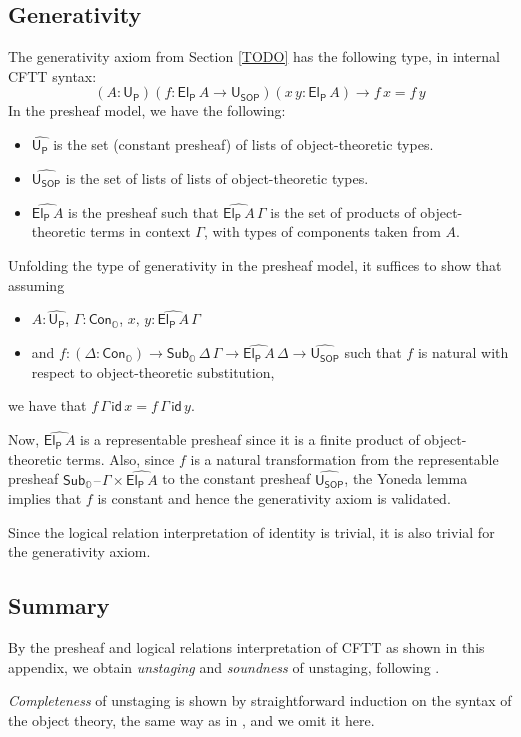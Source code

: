 \documentclass[acmsmall,screen,review,anonymous]{acmart}
\newcommand{\mit}[1]{{\mathsf{#1}}}
\newcommand{\msf}[1]{{\mathsf{#1}}}
\newcommand{\mbb}[1]{\mathbb{#1}}
\newcommand{\U}{\mathsf{U}}
\newcommand{\wh}[1]{\widehat{#1}}
\newcommand{\Cono}{\msf{Con}_{\mbbo}}
\newcommand{\Subo}{\msf{Sub}_{\mbbo}}
\newcommand{\mbbo}{\mbb{O}}
\newcommand{\USOP}{\msf{U}_{\msf{SOP}}}
\newcommand{\Uprod}{\msf{U_P}}
\newcommand{\Elprod}{\msf{El_{P}}}
\newcommand{\blank}{{\mathord{\hspace{1pt}\text{--}\hspace{1pt}}}}
\theoremstyle{remark}
\newcommand{\id}{\mit{id}}
\begin{document}
\subsection{Generativity}

The generativity axiom from Section \ref{TODO} has the following type, in internal
CFTT syntax:
\[ (A : \U_\msf{P})(f : \Elprod\,A \to \USOP)(x\,y : \Elprod\,A) \to f\,x = f\,y  \]
In the presheaf model, we have the following:
\begin{itemize}
\item $\wh{\Uprod}$ is the set (constant presheaf) of lists of object-theoretic types.
\item $\wh{\USOP}$ is the set of lists of lists of object-theoretic types.
\item $\wh{\Elprod\,A}$ is the presheaf such that $\wh{\Elprod\,A}\,\Gamma$ is
  the set of products of object-theoretic terms in context $\Gamma$, with types
  of components taken from $A$.
\end{itemize}
Unfolding the type of generativity in the presheaf model, it suffices to show
that assuming
\begin{itemize}
\item $A : \wh{\Uprod}$, $\Gamma : \Cono$, $x,\,y : \wh{\Elprod\,A}\,\Gamma$
\item and $f : (\Delta : \Cono) \to \Subo\,\Delta\,\Gamma \to \wh{\Elprod\,A}\,\Delta \to \wh{\USOP}$ such that $f$ is natural with respect to object-theoretic substitution,
\end{itemize}
we have that $f\,\Gamma\,\id\,x = f\,\Gamma\,\id\,y$.

Now, $\wh{\Elprod\,A}$ is a representable presheaf since it is a finite product
of object-theoretic terms. Also, since $f$ is a natural transformation from the
representable presheaf $\Subo\blank\Gamma \times \wh{\Elprod\,A}$ to the
constant presheaf $\wh{\USOP}$, the Yoneda lemma implies that $f$ is constant and
hence the generativity axiom is validated.

Since the logical relation interpretation of identity is trivial, it is also trivial
for the generativity axiom.

\subsection{Summary}

By the presheaf and logical relations interpretation of CFTT as shown in this appendix,
we obtain \emph{unstaging} and \emph{soundness} of unstaging, following \cite{staged2ltt}.

\emph{Completeness} of unstaging is shown by straightforward induction on the
syntax of the object theory, the same way as in \cite{staged2ltt}, and we omit
it here.


\end{document}
